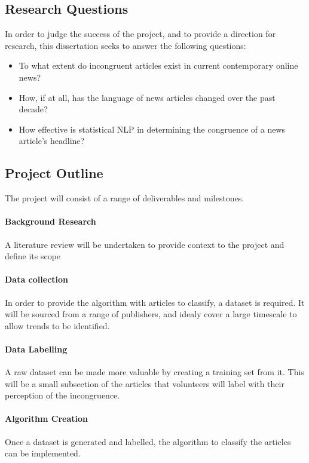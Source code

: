 \subsection{Research Questions}
In order to judge the success of the project, and to provide a direction for research, this dissertation seeks to answer the following questions:
\begin{itemize}
	\item To what extent do incongruent articles exist in current contemporary online news?
	\item How, if at all, has the language of news articles changed over the past decade?
	\item How effective is statistical NLP in determining the congruence of a news article's headline?
\end{itemize}

\subsection{Project Outline}
The project will consist of a range of deliverables and milestones.
 
\paragraph{Background Research}
A literature review will be undertaken to provide context to the project and define its scope

\paragraph{Data collection}
In order to provide the algorithm with articles to classify, a dataset is required. It will be sourced from a range of publishers, and idealy cover a large timescale to allow trends to be identified.

\paragraph{Data Labelling}
A raw dataset can be made more valuable by creating a training set from it. This will be a small subsection of the articles that volunteers will label with their perception of the incongruence.

\paragraph{Algorithm Creation}
Once a dataset is generated and labelled, the algorithm to classify the articles can be implemented. 

